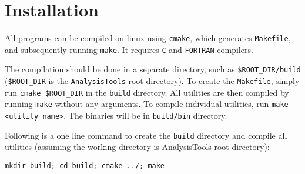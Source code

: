 \chapter{Installation} \label{chap:Install}

All programs can be compiled on linux using \texttt{cmake}, which generates
\texttt{Makefile}, and subsequently running \texttt{make}. It requires
\texttt{C} and \texttt{FORTRAN} compilers.

The compilation should be done in a separate directory, such as
\texttt{\$ROOT\_DIR/build} (\texttt{\$ROOT\_DIR} is the
\texttt{AnalysisTools} root directory). To create the \texttt{Makefile},
simply run \texttt{cmake \$ROOT\_DIR} in the \texttt{build} directory.  All
utilities are then compiled by running \texttt{make} without any arguments.
To compile individual utilities, run \texttt{make <utility name>}.
The binaries will be in \texttt{build/bin} directory.

Following is a one line command to create the \texttt{build} directory and
compile all utilities (assuming the working directory is AnalysisTools root
directory):

\texttt{mkdir build; cd build; cmake ../; make}
